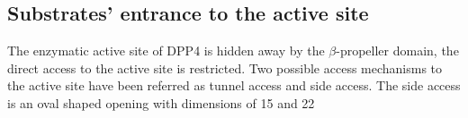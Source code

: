 \subsection{Substrates' entrance to the active site}

The enzymatic active site of DPP4 is hidden away by the $\beta$-propeller domain, the direct access to the active site is restricted. Two possible access mechanisms to the active site have been referred as tunnel access and side access. The side access is an oval shaped opening with dimensions of 15 and 22